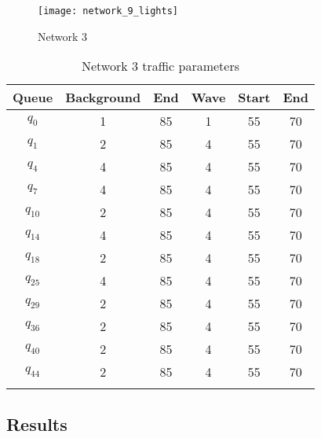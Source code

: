 \begin{figure*}[t!]
\centering
\texttt{[image: network\_9\_lights]}
\caption{Network 3}
\label{fig:network9}
\end{figure*}


\begin{table}[h]
\caption{Network 3 traffic parameters}
\label{tab:net3wave}
\centering
\begin{tabular}{cccccc}
\toprule
Queue & Background & End & Wave & Start &End\\ 
\midrule
$q_0$ & 1 & 85 & 1 & 55 & 70\\
$q_1$ & 2 & 85 & 4 & 55 & 70\\
$q_4$ & 4 & 85 & 4 & 55 & 70\\
$q_7$ & 4 & 85 & 4 & 55 & 70\\
$q_{10}$ & 2 & 85 & 4 & 55 & 70\\
$q_{14}$ & 4 & 85 & 4 & 55 & 70\\
$q_{18}$ & 2 & 85 & 4 & 55 & 70\\
$q_{25}$ & 4 & 85 & 4 & 55 & 70\\
$q_{29}$ & 2 & 85 & 4 & 55 & 70\\
$q_{36}$ & 2 & 85 & 4 & 55 & 70\\
$q_{40}$ & 2 & 85 & 4 & 55 & 70\\
$q_{44}$ & 2 & 85 & 4 & 55 & 70\\
\bottomrule\\
\end{tabular}
\end{table}

\subsection{Results}

